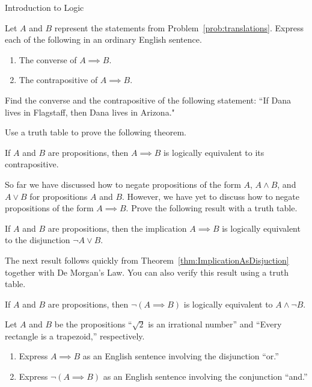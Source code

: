 \begin{section}{Introduction to Logic}
\begin{problem}
Let $A$ and $B$ represent the statements from Problem~\ref{prob:translations}.  Express each of the following in an ordinary English sentence.
\begin{enumerate}[label=\textrm{(\alph*)}]
\item The converse of $A \implies B$.
\item The contrapositive of $A \implies B$.
\end{enumerate}
\end{problem}

\begin{problem}
Find the converse and the contrapositive of the following statement: ``If Dana lives in Flagstaff, then Dana lives in Arizona."
\end{problem}

Use a truth table to prove the following theorem.

\begin{theorem}\label{thm:contrapos}
If $A$ and $B$ are propositions, then ${A\implies B}$ is logically equivalent to its contrapositive.
\end{theorem}

So far we have discussed how to negate propositions of the form $A$, $A\wedge B$, and $A\vee B$ for propositions $A$ and $B$.  However, we have yet to discuss how to negate propositions of the form $A\implies B$.  Prove the following result with a truth table.

\begin{theorem}\label{thm:ImplicationAsDisjuction}
If $A$ and $B$ are propositions, then the implication $A\implies B$ is logically equivalent to the disjunction $\neg A \vee B$.
\end{theorem}

The next result follows quickly from Theorem~\ref{thm:ImplicationAsDisjuction} together with De Morgan's Law. You can also verify this result using a truth table.

\begin{corollary}\label{cor:NegateImplication}
If $A$ and $B$ are propositions, then $\neg(A \implies B)$ is logically equivalent to $A \wedge \neg B$.
\end{corollary}

\begin{problem}\label{prob:Darth Vader}
Let $A$ and $B$ be the propositions ``$\sqrt{2}$ is an irrational number'' and ``Every rectangle is a trapezoid,'' respectively.
\begin{enumerate}[label=\textrm{(\alph*)}]
\item Express $A\implies B$ as an English sentence involving the disjunction ``or.''
\item Express $\neg(A\implies B)$ as an English sentence involving the conjunction ``and.''
\end{enumerate}
\end{problem}


\end{section}
